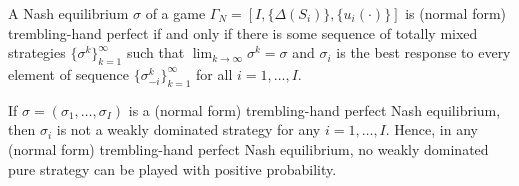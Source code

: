 \begin{prop}
    A Nash equilibrium $\sigma$ of a game $\Gamma_N = [I, \{\Delta(S_i)\}, \{u_i(\cdot)\}]$ is (normal form) trembling-hand perfect if and only if there is some sequence of totally mixed strategies $\{\sigma^k\}_{k = 1}^\infty$ such that $\lim_{k \to \infty} \sigma^k = \sigma$ and $\sigma_i$ is the best response to every element of sequence $\{\sigma_{-i}^k\}_{k = 1}^\infty$ for all $i = 1, \dots, I$.
\end{prop}

\begin{prop}
    If $\sigma = (\sigma_1, \dots, \sigma_I)$ is a (normal form) trembling-hand perfect Nash equilibrium, then $\sigma_i$ is not a weakly dominated strategy for any $i = 1, \dots, I$. Hence, in any (normal form) trembling-hand perfect Nash equilibrium, no weakly dominated pure strategy can be played with positive probability.
\end{prop}
